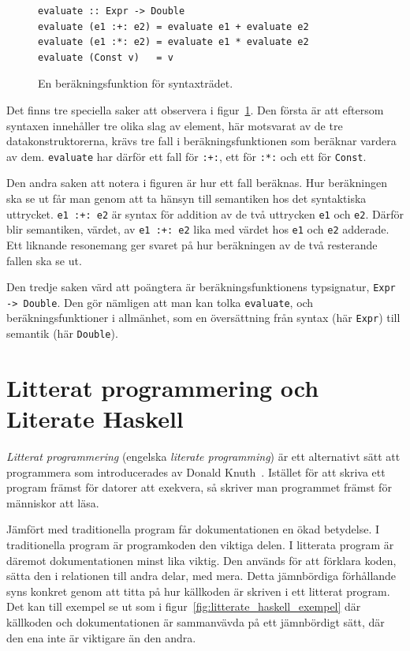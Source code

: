 \begin{figure}[tph]
  \begin{lstlisting}
evaluate :: Expr -> Double
evaluate (e1 :+: e2) = evaluate e1 + evaluate e2
evaluate (e1 :*: e2) = evaluate e1 * evaluate e2
evaluate (Const v)   = v
  \end{lstlisting}
  \caption{En beräkningsfunktion för syntaxträdet.}\label{fig:eval_tree}
\end{figure}

Det finns tre speciella saker att observera i
figur~\ref{fig:eval_tree}. Den första är att eftersom syntaxen innehåller tre olika
slag av element, här motsvarat av de tre datakonstruktorerna, krävs tre fall i
beräkningsfunktionen som beräknar vardera av dem. \texttt{evaluate} har
därför ett fall för \texttt{:+:}, ett för \texttt{:*:} och ett för
\texttt{Const}. 

Den andra saken att notera i figuren är hur ett fall
beräknas. Hur beräkningen ska se ut får man genom att ta hänsyn till
semantiken hos det syntaktiska uttrycket. \texttt{e1 :+: e2} är syntax för
addition av de två uttrycken \texttt{e1} och \texttt{e2}. Därför blir
semantiken, värdet, av \texttt{e1 :+: e2} lika med värdet hos \texttt{e1} och
\texttt{e2} adderade. Ett liknande resonemang ger svaret på hur beräkningen av
de två resterande fallen ska se ut.

Den tredje saken värd att poängtera är beräkningsfunktionens
typsignatur, \texttt{Expr -> Double}. Den gör nämligen att man kan tolka
\texttt{evaluate}, och beräkningsfunktioner i allmänhet, som en översättning
från syntax (här \texttt{Expr}) till semantik (här \texttt{Double}).

\section{Litterat programmering och Literate Haskell}\label{sec:lhs}

\textit{Litterat programmering} (engelska \textit{literate programming}) är ett
alternativt sätt att programmera som introducerades av Donald Knuth~\cite{knuth}.
Istället för att skriva ett program främst för datorer att exekvera, så skriver man
programmet främst för människor att läsa.

Jämfört med traditionella program får dokumentationen en
ökad betydelse. I traditionella program är programkoden den viktiga delen. I
litterata program är däremot dokumentationen minst lika viktig. Den används för
att förklara koden, sätta den i relationen till andra delar, med mera.
Detta jämnbördiga förhållande syns konkret genom att titta på hur källkoden är
skriven i ett litterat program. Det kan till exempel se ut som i
figur~\ref{fig:litterate_haskell_exempel} där källkoden och
dokumentationen är sammanvävda på ett jämnbördigt sätt, där den ena inte är
viktigare än den andra.

